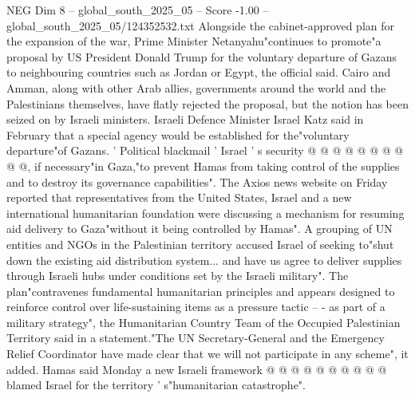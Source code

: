 \begin{textsample}{NEG Dim 8 – global\_south\_2025\_05 – Score -1.00 – global\_south\_2025\_05/124352532.txt}
Alongside the cabinet-approved plan for the expansion of the war, Prime Minister Netanyahu"continues to promote"a proposal by US President Donald Trump for the voluntary departure of Gazans to neighbouring countries such as Jordan or Egypt, the official said.
Cairo and Amman, along with other Arab allies, governments around the world and the Palestinians themselves, have flatly rejected the proposal, but the notion has been seized on by Israeli ministers.
Israeli Defence Minister Israel Katz said in February that a special agency would be established for the"voluntary departure"of Gazans. ' Political blackmail ' Israel ' s security @ @ @ @ @ @ @ @ @ @, if necessary"in Gaza,"to prevent Hamas from taking control of the supplies and to destroy its governance capabilities".
The Axios news website on Friday reported that representatives from the United States, Israel and a new international humanitarian foundation were discussing a mechanism for resuming aid delivery to Gaza"without it being controlled by Hamas".
A grouping of UN entities and NGOs in the Palestinian territory accused Israel of seeking to"shut down the existing aid distribution system... and have us agree to deliver supplies through Israeli hubs under conditions set by the Israeli military".
The plan"contravenes fundamental humanitarian principles and appears designed to reinforce control over life-sustaining items as a pressure tactic -- - as part of a military strategy", the Humanitarian Country Team of the Occupied Palestinian Territory said in a statement."The UN Secretary-General and the Emergency Relief Coordinator have made clear that we will not participate in any scheme", it added.
Hamas said Monday a new Israeli framework @ @ @ @ @ @ @ @ @ @ blamed Israel for the territory ' s"humanitarian catastrophe".

\end{textsample}
